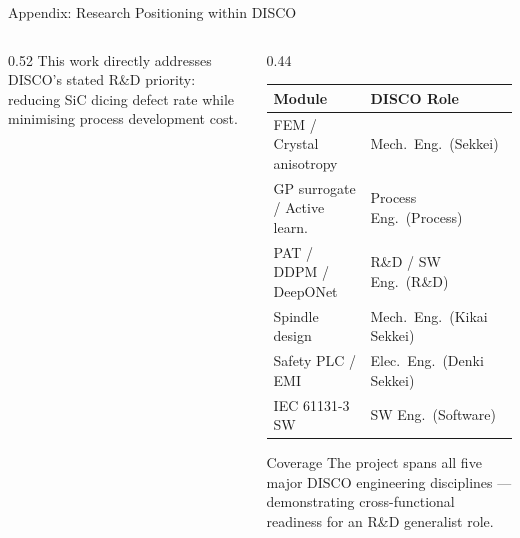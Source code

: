 \documentclass[aspectratio=169,11pt]{beamer}
\begin{document}
\begin{frame}[shrink=10]{Appendix: Research Positioning within DISCO}
\begin{columns}[T]
\begin{column}{0.52\textwidth}
      \vspace{0.3em}
      {\small This work directly addresses DISCO's stated R\&D
      priority: reducing SiC dicing defect rate while minimising
      process development cost.}
    \end{column}
    \begin{column}{0.44\textwidth}
      \small
      \begin{tabular}{ll}
        \toprule
        \textbf{Module} & \textbf{DISCO Role} \\
        \midrule
        FEM / Crystal anisotropy     & Mech.\ Eng.\ (Sekkei) \\
        GP surrogate / Active learn. & Process Eng.\ (Process) \\
        PAT / DDPM / DeepONet        & R\&D / SW Eng.\ (R\&D) \\
        Spindle design               & Mech.\ Eng.\ (Kikai Sekkei) \\
        Safety PLC / EMI             & Elec.\ Eng.\ (Denki Sekkei) \\
        IEC 61131-3 SW               & SW Eng.\ (Software) \\
        \bottomrule
      \end{tabular}

      \vspace{0.6em}
      \begin{block}{\small Coverage}
        \small
        The project spans all five major DISCO engineering
        disciplines --- demonstrating cross-functional readiness
        for an R\&D generalist role.
      \end{block}
    \end{column}
  \end{columns}
\end{frame}
\end{document}
